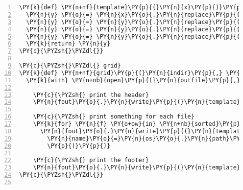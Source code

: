 \begin{Verbatim}[commandchars=\\\{\},numbers=left,numbersep=0.5em]
\PY{k}{def} \PY{n+nf}{template}\PY{p}{(}\PY{n}{x}\PY{p}{)}\PY{p}{:}
  \PY{n}{y} \PY{o}{=} \PY{n}{x}\PY{o}{.}\PY{n}{replace}\PY{p}{(}\PY{l+s}{\PYZdq{}}\PY{l+s}{\PYZob{}}\PY{l+s}{\PYZdq{}}\PY{p}{,}\PY{l+s}{\PYZdq{}}\PY{l+s}{\PYZob{}\PYZob{}}\PY{l+s}{\PYZdq{}}\PY{p}{)}
  \PY{n}{y} \PY{o}{=} \PY{n}{y}\PY{o}{.}\PY{n}{replace}\PY{p}{(}\PY{l+s}{\PYZdq{}}\PY{l+s}{\PYZcb{}}\PY{l+s}{\PYZdq{}}\PY{p}{,}\PY{l+s}{\PYZdq{}}\PY{l+s}{\PYZcb{}\PYZcb{}}\PY{l+s}{\PYZdq{}}\PY{p}{)}
  \PY{n}{y} \PY{o}{=} \PY{n}{y}\PY{o}{.}\PY{n}{replace}\PY{p}{(}\PY{l+s}{\PYZdq{}}\PY{l+s}{[=[}\PY{l+s}{\PYZdq{}}\PY{p}{,}\PY{l+s}{\PYZdq{}}\PY{l+s}{\PYZob{}}\PY{l+s}{\PYZdq{}}\PY{p}{)}
  \PY{n}{y} \PY{o}{=} \PY{n}{y}\PY{o}{.}\PY{n}{replace}\PY{p}{(}\PY{l+s}{\PYZdq{}}\PY{l+s}{]=]}\PY{l+s}{\PYZdq{}}\PY{p}{,}\PY{l+s}{\PYZdq{}}\PY{l+s}{\PYZcb{}}\PY{l+s}{\PYZdq{}}\PY{p}{)}
  \PY{k}{return} \PY{n}{y}
\PY{c}{\PYZsh{}\PYZdl{}}

\PY{c}{\PYZsh{}\PYZdl{} grid}
\PY{k}{def} \PY{n+nf}{grid}\PY{p}{(}\PY{n}{indir}\PY{p}{,} \PY{n}{outfile}\PY{p}{,} \PY{n}{C}\PY{o}{=}\PY{l+m+mi}{5}\PY{p}{,} \PY{n}{N}\PY{o}{=}\PY{n+nb+bp}{None}\PY{p}{)}\PY{p}{:}
  \PY{k}{with} \PY{n+nb}{open}\PY{p}{(}\PY{n}{outfile}\PY{p}{,} \PY{l+s}{\PYZdq{}}\PY{l+s}{w}\PY{l+s}{\PYZdq{}}\PY{p}{)} \PY{k}{as} \PY{n}{fout}\PY{p}{:}
    
    \PY{c}{\PYZsh{} print the header}
    \PY{n}{fout}\PY{o}{.}\PY{n}{write}\PY{p}{(}\PY{n}{template}\PY{p}{(}\PY{n}{header}\PY{p}{)}\PY{o}{.}\PY{n}{format}\PY{p}{(}\PY{n}{cols}\PY{o}{=}\PY{n}{C}\PY{p}{)}\PY{p}{)}
    
    \PY{c}{\PYZsh{} print something for each file}
    \PY{k}{for} \PY{n}{f} \PY{o+ow}{in} \PY{n+nb}{sorted}\PY{p}{(}\PY{n}{os}\PY{o}{.}\PY{n}{listdir}\PY{p}{(}\PY{n}{indir}\PY{p}{)}\PY{p}{)}\PY{p}{[}\PY{p}{:}\PY{n}{N}\PY{p}{]}\PY{p}{:}
      \PY{n}{fout}\PY{o}{.}\PY{n}{write}\PY{p}{(}\PY{n}{template}\PY{p}{(}\PY{n}{texstring}\PY{p}{)}\PY{o}{.}\PY{n}{format}\PY{p}{(}
        \PY{n}{name}\PY{o}{=}\PY{n}{os}\PY{o}{.}\PY{n}{path}\PY{o}{.}\PY{n}{join}\PY{p}{(}\PY{n}{indir}\PY{p}{,}\PY{n}{f}\PY{p}{)}\PY{p}{,}
        \PY{p}{)}\PY{p}{)}
      
    \PY{c}{\PYZsh{} print the footer}
    \PY{n}{fout}\PY{o}{.}\PY{n}{write}\PY{p}{(}\PY{n}{template}\PY{p}{(}\PY{n}{footer}\PY{p}{)}\PY{o}{.}\PY{n}{format}\PY{p}{(}\PY{p}{)}\PY{p}{)}
\PY{c}{\PYZsh{}\PYZdl{}}


\end{Verbatim}
